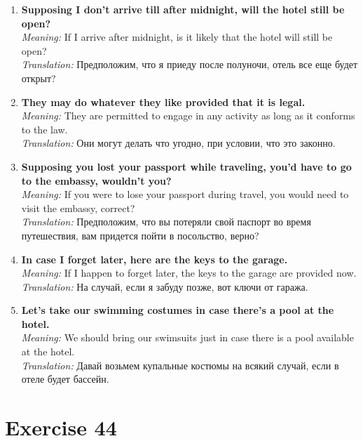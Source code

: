 \begin{enumerate}
      \item \textbf{Supposing I don’t arrive till after midnight, will the hotel still be open?} \\
            \textit{Meaning:} If I arrive after midnight, is it likely that the hotel will still be open? \\
            \textit{Translation:} Предположим, что я приеду после полуночи, отель все еще будет открыт?

      \item \textbf{They may do whatever they like provided that it is legal.} \\
            \textit{Meaning:} They are permitted to engage in any activity as long as it conforms to the law. \\
            \textit{Translation:} Они могут делать что угодно, при условии, что это законно.

      \item \textbf{Supposing you lost your passport while traveling, you’d have to go to the embassy, wouldn’t you?} \\
            \textit{Meaning:} If you were to lose your passport during travel, you would need to visit the embassy, correct? \\
            \textit{Translation:} Предположим, что вы потеряли свой паспорт во время путешествия, вам придется пойти в посольство, верно?

      \item \textbf{In case I forget later, here are the keys to the garage.} \\
            \textit{Meaning:} If I happen to forget later, the keys to the garage are provided now. \\
            \textit{Translation:} На случай, если я забуду позже, вот ключи от гаража.

      \item \textbf{Let’s take our swimming costumes in case there’s a pool at the hotel.} \\
            \textit{Meaning:} We should bring our swimsuits just in case there is a pool available at the hotel. \\
            \textit{Translation:} Давай возьмем купальные костюмы на всякий случай, если в отеле будет бассейн.

\end{enumerate}

\section{Exercise 44}

